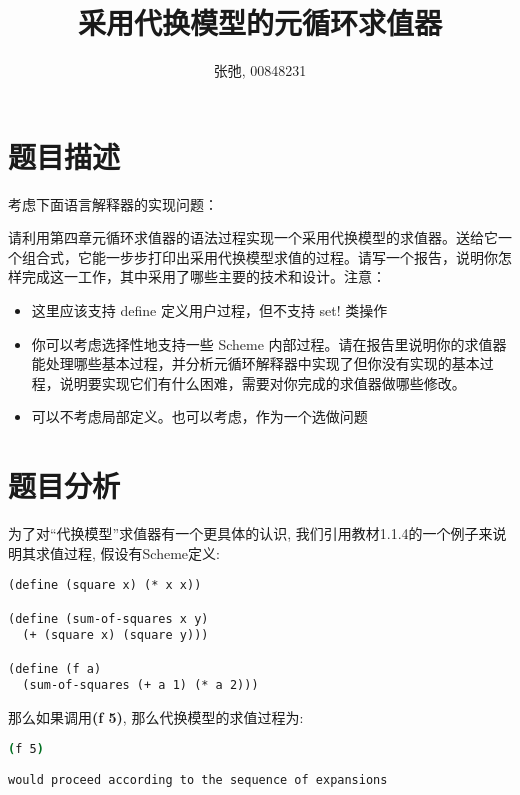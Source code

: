 \documentclass{article}
\title{采用代换模型的元循环求值器}
\author{张弛, 00848231}
\begin{document}
\begin{CJK*}{UTF8}{gkai}

\maketitle

\section{题目描述}

考虑下面语言解释器的实现问题：

请利用第四章元循环求值器的语法过程实现一个采用代换模型的求值器。送给它一个组合式，它能一步步打印出采用代换模型求值的过程。请写一个报告，说明你怎样完成这一工作，其中采用了哪些主要的技术和设计。注意：

\begin{itemize}
    \item 这里应该支持 define 定义用户过程，但不支持 set! 类操作
    \item 你可以考虑选择性地支持一些 Scheme 内部过程。请在报告里说明你的求值器能处理哪些基本过程，并分析元循环解释器中实现了但你没有实现的基本过程，说明要实现它们有什么困难，需要对你完成的求值器做哪些修改。
    \item 可以不考虑局部定义。也可以考虑，作为一个选做问题
\end{itemize}

\section{题目分析}

为了对``代换模型''求值器有一个更具体的认识, 我们引用教材1.1.4的一个例子来说明其求值过程, 假设有Scheme定义:



\begin{lstlisting}[caption=样例程序]
(define (square x) (* x x))

(define (sum-of-squares x y)
  (+ (square x) (square y)))
  
(define (f a)
  (sum-of-squares (+ a 1) (* a 2)))
\end{lstlisting}


那么如果调用{\bfseries \ttfamily (f 5)}, 那么代换模型的求值过程为:

\begin{lstlisting}[language=bash, numbers=none, basicstyle=\footnotesize\color{green}\ttfamily\bfseries, backgroundcolor=\color{black}]
(f 5)

would proceed according to the sequence of expansions


\end{lstlisting}
\end{CJK*}
\end{document}
